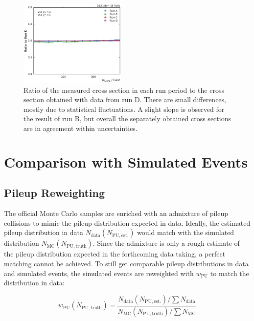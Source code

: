 \begin{figure}[htbp]
    \includegraphics[width=0.47\textwidth]{figures/measurement/run_comparison_yb2ys0.pdf}
    \caption[Stability of result over all run periods]{Ratio of the measured
    cross section in each run period to the cross section obtained with data
    from run D. There are small differences, mostly due to statistical fluctuations.
    A slight slope is observed for the result of run B, but overall the separately
    obtained cross sections are in agreement within uncertainties.}
    \label{fig:run_comparison}
\end{figure}

\section{Comparison with Simulated Events}
\label{sec:simulated_events}

\subsection{Pileup Reweighting}

The official Monte Carlo samples are enriched with an admixture of pileup
collisions to mimic the pileup distribution expected in data. Ideally, the
estimated pileup distribution in data $N_\mathrm{data} (N_\mathrm{PU, est.})$
would match with the simulated distribution $N_\mathrm{MC} (N_\mathrm{PU,
truth})$. Since the admixture is only a rough estimate of the pileup
distribution expected in the forthcoming data taking, a perfect matching cannot
be achieved. To still get comparable pileup distributions in data and simulated
events, the simulated events are reweighted with $w_\mathrm{PU}$ to
match the distribution in data: 

\begin{equation*}
    w_{\mathrm{PU}} (N_{\mathrm{PU, truth}}) = \frac{N_\mathrm{data}
    (N_\mathrm{PU, est.}) / \sum N_\mathrm{data}}{N_\mathrm{MC}
    (N_\mathrm{PU, truth}) / \sum N_\mathrm{MC}}
\end{equation*}

